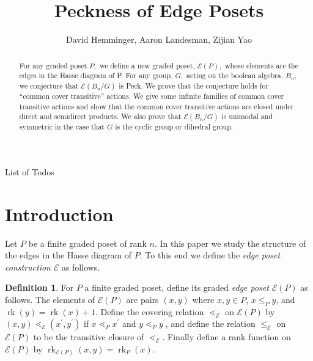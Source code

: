 \documentclass[10 pt]{amsart}
\title{Peckness of Edge Posets}
\author{David Hemminger, Aaron Landesman, Zijian Yao}
\makeatletter
\theoremstyle{plain}
\theoremstyle{definition}
\newtheorem{defn}[thm]{Definition}
\theoremstyle{remark}
\numberwithin{equation}{section}
\newcommand\rk{\operatorname{rk}}
\def\listtodoname{List of Todos}
\def\listoftodos{\@starttoc{tdo}\listtodoname}
\makeatother
\begin{document}
\begin{abstract}
For any graded poset $P,$ we define a new graded poset, $\mathcal E(P),$ whose elements are the edges in the Hasse diagram of P. For any group, $G,$ acting on the boolean algebra, $B_n,$ we conjecture that $\mathcal E(B_n/G)$ is Peck. We prove that the conjecture holds for ``common cover transitive'' actions. We give some infinite families of common cover transitive actions and show that the common cover transitive actions are closed under direct and semidirect products. We also prove that $\mathcal E(B_n/G)$ is unimodal and symmetric in the case that $G$ is the cyclic group or dihedral group.
\end{abstract}

\maketitle

\tableofcontents
\newpage

\listoftodos
\newpage

\section{Introduction}\label{sec:introduction}

Let $P$ be a finite graded poset of rank $n$.  In this paper we study the structure of the edges in the Hasse diagram of $P$.  To this end we define the \textit{edge poset construction} $\mathcal{E}$ as follows.

\begin{defn}
\label{defn:functor_of_edges}
For $P$ a finite graded poset, define its graded \textit{edge poset} $\mathcal{E}(P)$ as follows.  The elements of $\mathcal E(P)$ are pairs $(x,y)$ where $x,y\in P$, $x\le_P y$, and $\rk(y) = \rk(x) + 1$. Define the covering relation $\lessdot_{\mathcal E}$ on $\mathcal E(P)$ by $(x, y) \lessdot_{\mathcal E} (x^\prime, y^\prime)$ if $x\lessdot_P x^\prime$ and $y\lessdot_P y^\prime$, and define the relation $\le_{\mathcal E}$ on $\mathcal E(P)$ to be the transitive closure of $\lessdot_{\mathcal E}$.  Finally define a rank function on $\mathcal{E}(P)$ by $\rk_{\mathcal{E}(P)}(x,y) = \rk_P(x)$.
\end{defn}
\end{document}
